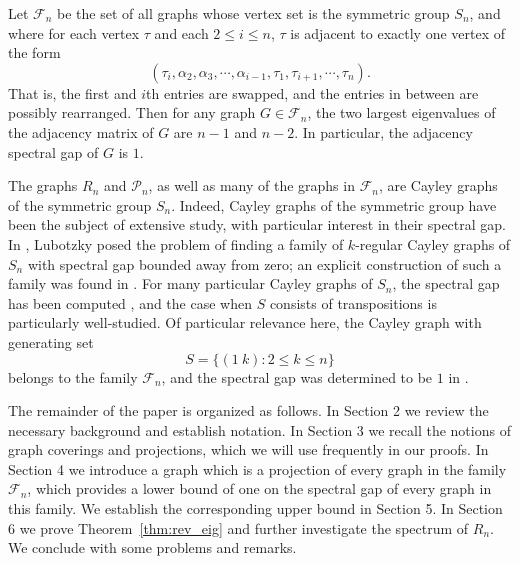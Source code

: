 \begin{theorem}\label{thm:main}
 Let $\mathcal{F}_n$ be the set of all graphs whose vertex set is the symmetric
 group $S_n$, and where for each vertex $\tau$ and each $2 \leq i \leq n$, 
 $\tau$ is adjacent to exactly one vertex of the form 
 \[ (\tau_i, \alpha_2, \alpha_3, \cdots, \alpha_{i-1}, \tau_1, \tau_{i+1}, \cdots, \tau_n). \]
 That is, the first and $i$th entries are swapped, and the entries in between are possibly rearranged.
 Then for any graph $G \in \mathcal{F}_n$, the two largest eigenvalues of
 the adjacency matrix of $G$ are $n-1$ and $n-2$.  In particular, the 
 adjacency spectral gap of $G$ is $1$.
\end{theorem}

The graphs $R_n$ and $\mathcal{P}_n$, as well as many of the graphs in 
$\mathcal{F}_n$, are Cayley graphs of the symmetric group $S_n$.
Indeed, Cayley graphs of the symmetric group  
have been the subject of extensive study,
with particular interest in their spectral gap.  In \cite{Lubotzky1995}, 
Lubotzky posed the problem of finding a family of $k$-regular Cayley
graphs of $S_n$ with spectral gap bounded away from zero;  an explicit
construction of such a family was found in \cite{Kassabov2007}.  For many 
particular Cayley graphs of $S_n$, the spectral gap has been computed
\cite{Friedman2000,FlattoEtAl1985,Cesi2009},
and the case when $S$ consists of transpositions is particularly well-studied.
Of particular relevance here, the Cayley graph with generating set
\[S = \{(1\ k) : 2 \leq k \leq n\}\] 
belongs to the family $\mathcal{F}_n$, and
the spectral gap was determined to be $1$ in \cite{FlattoEtAl1985}.


The remainder of the paper is organized as follows.  In Section 2 we review
the necessary background and establish notation.  In Section 3 we recall
the notions of graph coverings and projections, which we will use frequently 
in our proofs.  In Section 4 we introduce a graph which is a projection
of every graph in the family $\mathcal{F}_n$, which provides a lower bound of one
on the spectral gap of every graph in this family.  We establish the corresponding upper bound in Section 5.
In Section 6 we prove Theorem~\ref{thm:rev_eig} and further investigate
the spectrum of $R_n$.  We conclude with some problems and remarks.




